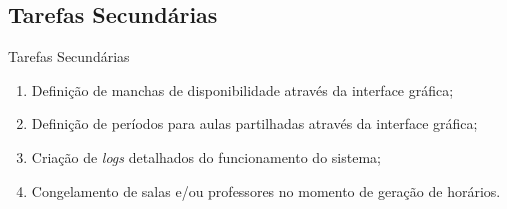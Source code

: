 \documentclass[11]{beamer}
\begin{document}
    \subsection{Tarefas Secundárias}

    \begin{frame}{Tarefas Secundárias}
        \begin{enumerate}
            \item Definição de manchas de disponibilidade através da interface gráfica;
            \item Definição de períodos para aulas partilhadas através da interface gráfica;
            \item Criação de \textit{logs} detalhados do funcionamento do sistema;
            \item Congelamento de salas e/ou professores no momento de geração de horários.
        \end{enumerate}
    \end{frame}

\end{document}
